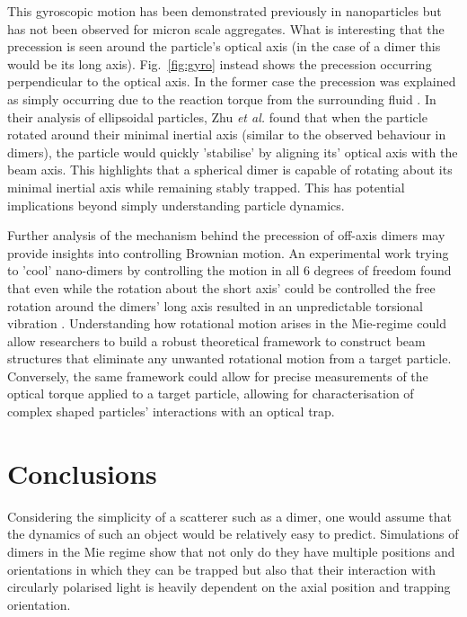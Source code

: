 This gyroscopic motion has been demonstrated previously in 
nanoparticles \cite{Zhu2021, Rashid2018, Hoang2016, Kuhn2016} 
but has not been observed for micron scale aggregates. What
is interesting that the precession is seen around the particle's
optical axis (in the case of a dimer this would be its long 
axis). Fig.~\ref{fig:gyro} instead shows the precession 
occurring perpendicular to the optical axis. In the former 
case the precession was explained as simply occurring due 
to the reaction torque from the surrounding fluid \cite{Zhu2021}.
In their analysis of ellipsoidal particles, Zhu \textit{et al.}
found that when the particle rotated around their minimal inertial 
axis (similar to the observed behaviour in dimers), the particle 
would quickly 'stabilise' by aligning its' optical axis with the 
beam axis. This highlights that a spherical dimer is capable of 
rotating about its minimal inertial axis while remaining stably
trapped. This has potential implications beyond simply 
understanding particle dynamics. 

Further analysis of the mechanism behind the precession of off-axis 
dimers may provide insights into controlling Brownian motion. An 
experimental work trying to 'cool' nano-dimers by controlling the 
motion in all 6 degrees of freedom found that even while the 
rotation about the short axis' could be controlled the free rotation 
around the dimers' long axis resulted in an unpredictable torsional 
vibration \cite{Bang2020}. Understanding how rotational motion 
arises in the Mie-regime could allow researchers to build a robust 
theoretical framework to construct beam structures that eliminate any 
unwanted rotational motion from a target particle. Conversely, the 
same framework could allow for precise measurements of the optical 
torque applied to a target particle, allowing for characterisation 
of complex shaped particles' interactions with an optical trap. 


\section{Conclusions}
Considering the simplicity of a scatterer such as a dimer, 
one would assume that the dynamics of such an object would 
be relatively easy to predict. Simulations of dimers in 
the Mie regime show that not only do they have multiple 
positions and orientations in which they can be trapped but 
also that their interaction with circularly polarised light 
is heavily dependent on the axial position and trapping 
orientation. 

